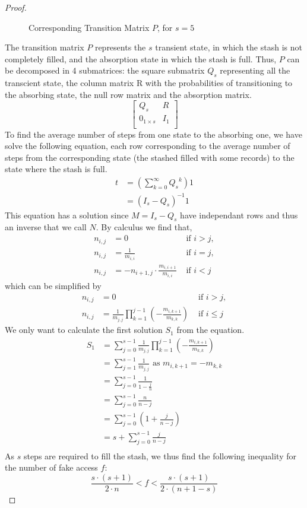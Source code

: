 \documentclass[a4paper]{article}
\begin{document}
\begin{proof}
\begin{figure}
\caption{Corresponding Transition Matrix $P$, for $s=5$} \label{fig:ATM}
\end{figure}
The transition matrix $P$ represents the $s$ transient state, in which the stash is not completely filled, and the absorption state in which the stash is full.
Thus, $P$ can be decomposed in 4 submatrices: the square submatrix $Q_s$ representing all the transcient state, the column matrix R with the probabilities of transitioning to the absorbing state, the null row matrix and the absorption matrix.
\[
\begin{bmatrix}
   Q_s & R \\
   0_{1\times s}   & I_1 \\
\end{bmatrix}
\]
To find the average number of steps from one state to the absorbing one, we have solve the following equation, each row corresponding to the average number of steps from the corresponding state (the stashed filled with some records) to the state where the stash is full.
\begin{align*}
 t &= \left (\sum_{k=0}^{\infty} {Q_s}^k \right ) 1 \\
   &= (I_s -Q_s )^{-1} 1
\end{align*}
This equation has a solution since $M=I_s -Q_s$ have independant rows and thus an inverse that we call $N$.
By calculus we find that,
\begin{align*}
 n_{i,j} &= 0 &\text{ if } i>j,\\ 
 n_{i,j} &= \frac{1}{m_{i,i}} &\text{ if } i=j,\\
 n_{i,j} &= - n_{i+1,j } \cdot \frac{m_{i,i+1}}{m_{i,i}} &\text{ if } i<j 
\end{align*}
which can be simplified by
\begin{align*}
 n_{i,j} &= 0 &\text{ if } i>j,\\ 
 n_{i,j} &= \frac{1}{m_{j,j}} \prod_{k=1}^{j-1} \left ( - \frac{m_{i,k+1}}{m_{k,k}}\right ) &\text{ if } i\leq j
\end{align*}
We only want to calculate the first solution $S_1$ from the equation.
\begin{align*}
 S_1 &= \sum_{j=0}^{s-1} \frac{1}{m_{j,j}} \prod_{k=1}^{j-1} \left ( - \frac{m_{i,k+1}}{m_{k,k}}\right ) \\
     &= \sum_{j=1}^{s-1} \frac{1}{m_{j,j}} \text{ as } m_{i,k+1}= -m_{k,k} \\
     &= \sum_{j=0}^{s-1} \frac{1}{1-\frac{j}{n}}\\
     &= \sum_{j=0}^{s-1} \frac{n}{n-j}\\
     &= \sum_{j=0}^{s-1} \left (1 + \frac{j}{n-j} \right ) \\
     &= s + \sum_{j=0}^{s-1} \frac{j}{n-j} \\   
\end{align*}
As $s$ steps are required to fill the stash, we thus find the following inequality for the number of fake access $f$:
$$ \frac{s \cdot (s+1)}{2 \cdot n} < f < \frac{s \cdot (s+1)}{2 \cdot (n+1-s)} $$


\end{proof}
\end{document}
